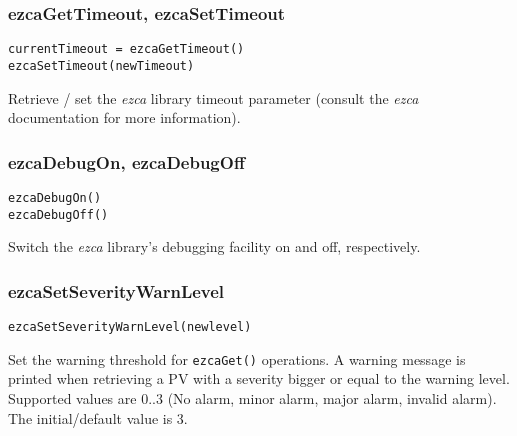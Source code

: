 \documentclass{article}
\newcommand{\ezca}{{\em ezca}}
\newcommand{\com}[1]{{\tt #1}}
\begin{document}
\subsubsection{ezcaGetTimeout, ezcaSetTimeout}
\begin{verbatim}
currentTimeout = ezcaGetTimeout()
ezcaSetTimeout(newTimeout)
\end{verbatim}
Retrieve / set the \ezca{} library timeout parameter (consult the \ezca{}
documentation for more information).

\subsubsection{ezcaDebugOn, ezcaDebugOff}
\begin{verbatim}
ezcaDebugOn()
ezcaDebugOff()
\end{verbatim}
Switch the \ezca{} library's debugging facility on and off, respectively.

\subsubsection{ezcaSetSeverityWarnLevel}
\label{swarnlevel}
\begin{verbatim}
ezcaSetSeverityWarnLevel(newlevel)
\end{verbatim}
Set the warning threshold for \com{ezcaGet()} operations.
A warning message is printed when retrieving a PV with a severity bigger
or equal to the warning level. Supported values are $0..3$ (No alarm,
minor alarm, major alarm, invalid alarm). The initial/default value is 3.
\end{document}
